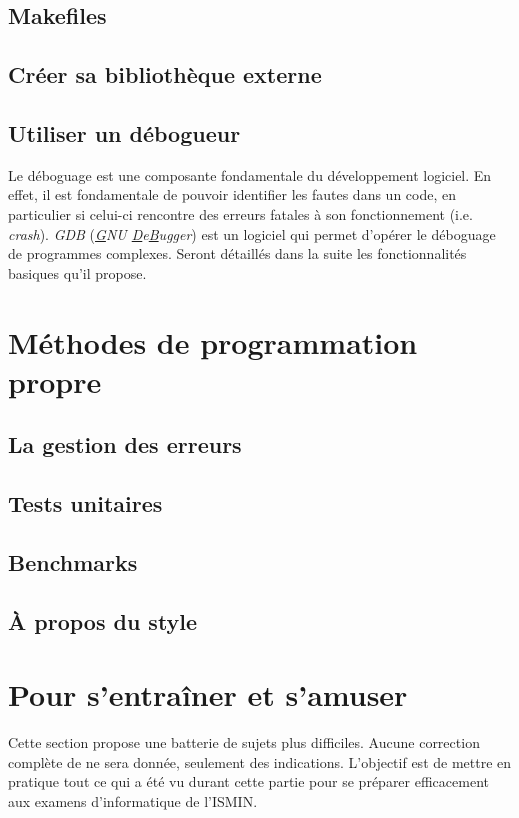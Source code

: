 \documentclass{minitelreport}
\begin{document}
\begin{refsection}
		\section{Makefiles}
		
		\section{Créer sa bibliothèque externe}
		\section{Utiliser un débogueur}
		Le déboguage est une composante fondamentale du développement logiciel. En effet, il est fondamentale de pouvoir identifier les fautes dans un code, en particulier si celui-ci rencontre des erreurs fatales à son fonctionnement (i.e. \textit{crash}). \textit{GDB} (\textit{\underline{G}NU \underline{D}e\underline{B}ugger}) est un logiciel qui permet d'opérer le déboguage de programmes complexes. Seront détaillés dans la suite les fonctionnalités basiques qu'il propose.
	\chapter{Méthodes de programmation propre}
		\section{La gestion des erreurs}
		
		\section{Tests unitaires}
		
		\section{Benchmarks}
		
		\section{À propos du style}
		
	\chapter{Pour s'entraîner et s'amuser}
		Cette section propose une batterie de sujets plus difficiles. Aucune correction complète de ne sera donnée, seulement des indications. L'objectif est de mettre en pratique tout ce qui a été vu durant cette partie pour se préparer efficacement aux examens d'informatique de l'ISMIN.


\end{refsection}
\end{document}
